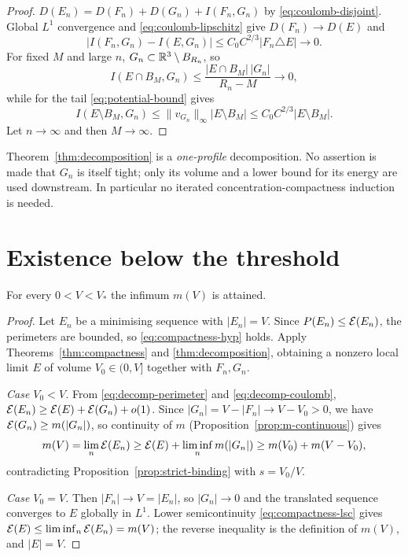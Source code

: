\begin{proof}
$D(E_n)=D(F_n)+D(G_n)+I(F_n,G_n)$ by \eqref{eq:coulomb-disjoint}.  Global
$L^1$ convergence and \eqref{eq:coulomb-lipschitz} give $D(F_n)\to D(E)$ and
\[
  |I(F_n,G_n)-I(E,G_n)|\le C_0C^{2/3}|F_n\triangle E|\to0 .
\]
For fixed $M$ and large $n$, $G_n\subset\mathbb R^3\setminus B_{R_n}$, so
\[
  I(E\cap B_M,G_n)\le\frac{|E\cap B_M|\,|G_n|}{R_n-M}\longrightarrow0 ,
\]
while for the tail \eqref{eq:potential-bound} gives
\[
  I(E\setminus B_M,G_n)\le\|v_{G_n}\|_\infty|E\setminus B_M|
  \le C_0C^{2/3}|E\setminus B_M| .
\]
Let $n\to\infty$ and then $M\to\infty$.
\end{proof}

\begin{remark}\label{rem:one-profile}
Theorem~\ref{thm:decomposition} is a \emph{one-profile} decomposition.  No
assertion is made that $G_n$ is itself tight; only its volume and a lower
bound for its energy are used downstream.  In particular no iterated
concentration-compactness induction is needed.
\end{remark}

\section{Existence below the threshold}

\begin{proposition}\label{prop:existence-subcritical}
For every $0<V<V_*$ the infimum $m(V)$ is attained.
\end{proposition}

\begin{proof}
Let $E_n$ be a minimising sequence with $|E_n|=V$.  Since
$P(E_n)\le\mathcal E(E_n)$, the perimeters are bounded, so
\eqref{eq:compactness-hyp} holds.  Apply
Theorems~\ref{thm:compactness} and \ref{thm:decomposition}, obtaining a
nonzero local limit $E$ of volume $V_0\in(0,V]$ together with $F_n,G_n$.

\emph{Case $V_0<V$.}  From \eqref{eq:decomp-perimeter} and
\eqref{eq:decomp-coulomb},
$\mathcal E(E_n)\ge\mathcal E(E)+\mathcal E(G_n)+o(1)$.  Since
$|G_n|=V-|F_n|\to V-V_0>0$, we have $\mathcal E(G_n)\ge m(|G_n|)$, so continuity of
$m$ (Proposition~\ref{prop:m-continuous}) gives
\[
  m(V)=\lim_n\mathcal E(E_n)
  \ge\mathcal E(E)+\liminf_nm(|G_n|)
  \ge m(V_0)+m(V-V_0),
\]
contradicting Proposition~\ref{prop:strict-binding} with $s=V_0/V$.

\emph{Case $V_0=V$.}  Then $|F_n|\to V=|E_n|$, so $|G_n|\to0$ and the
translated sequence converges to $E$ globally in $L^1$.  Lower
semicontinuity \eqref{eq:compactness-lsc} gives
$\mathcal E(E)\le\liminf_n\mathcal E(E_n)=m(V)$; the reverse inequality is the definition of
$m(V)$, and $|E|=V$.
\end{proof}

